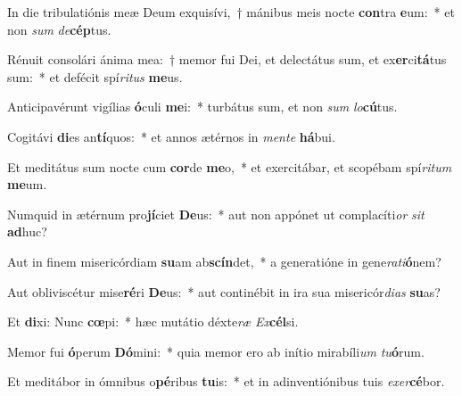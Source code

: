 \item In die tribulatiónis meæ Deum exquisívi,~† mánibus meis nocte \textbf{con}tra \textbf{e}um:~* et non \textit{sum} \textit{de}\textbf{cép}tus.
\item Rénuit consolári ánima mea:~† memor fui Dei, et delectátus sum, et ex\textbf{er}ci\textbf{tá}tus sum:~* et defécit spí\textit{ri}\textit{tus} \textbf{me}us.
\item Anticipavérunt vigílias \textbf{ó}culi \textbf{me}i:~* turbátus sum, et non \textit{sum} \textit{lo}\textbf{cú}tus.
\item Cogitávi \textbf{di}es an\textbf{tí}quos:~* et annos ætérnos in \textit{men}\textit{te} \textbf{há}bui.
\item Et meditátus sum nocte cum \textbf{cor}de \textbf{me}o,~* et exercitábar, et scopébam spí\textit{ri}\textit{tum} \textbf{me}um.
\item Numquid in ætérnum pro\textbf{jí}ciet \textbf{De}us:~* aut non appónet ut complacíti\textit{or} \textit{sit} \textbf{ad}huc?
\item Aut in finem misericórdiam \textbf{su}am ab\textbf{scín}det,~* a generatióne in gene\textit{ra}\textit{ti}\textbf{ó}nem?
\item Aut obliviscétur mise\textbf{ré}ri \textbf{De}us:~* aut continébit in ira sua misericór\textit{di}\textit{as} \textbf{su}as?
\item Et \textbf{di}xi: Nunc \textbf{cœ}pi:~* hæc mutátio déxte\textit{ræ} \textit{Ex}\textbf{cél}si.
\item Memor fui \textbf{ó}perum \textbf{Dó}mini:~* quia memor ero ab inítio mirabíli\textit{um} \textit{tu}\textbf{ó}rum.
\item Et meditábor in ómnibus o\textbf{pé}ribus \textbf{tu}is:~* et in adinventiónibus tuis \textit{ex}\textit{er}\textbf{cé}bor.
